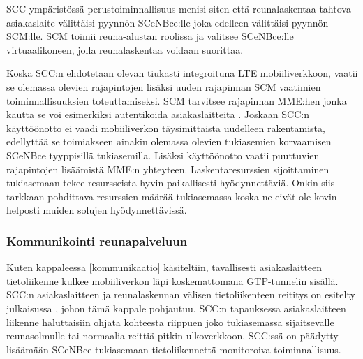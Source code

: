 SCC ympäristössä perustoiminnallisuus menisi siten että reunalaskentaa tahtova asiakaslaite välittäisi pyynnön SCeNBce:lle joka edelleen välittäisi pyynnön SCM:lle.
SCM toimii reuna-alustan roolissa ja valitsee SCeNBce:lle virtuaalikoneen, jolla reunalaskentaa voidaan suorittaa. \cite{dolezal2016performance}


Koska SCC:n ehdotetaan olevan tiukasti integroituna LTE mobiiliverkkoon, vaatii se olemassa olevien rajapintojen lisäksi uuden rajapinnan SCM vaatimien toiminnallisuuksien toteuttamiseksi. SCM tarvitsee rajapinnan MME:hen jonka kautta se voi esimerkiksi autentikoida asiakaslaitteita \cite{lobillo15scc}. 
Joskaan SCC:n käyttöönotto ei vaadi mobiiliverkon täysimittaista uudelleen rakentamista, edellyttää se toimiakseen ainakin olemassa olevien tukiasemien korvaamisen SCeNBce tyyppisillä tukiasemilla. Lisäksi käyttöönotto vaatii puuttuvien rajapintojen lisäämistä MME:n yhteyteen. 
Laskentaresurssien sijoittaminen tukiasemaan tekee resursseista hyvin paikallisesti hyödynnettäviä. Onkin siis tarkkaan pohdittava resurssien määrää tukiasemassa koska ne eivät ole kovin helposti muiden solujen hyödynnettävissä.

 
%

\subsubsection{Kommunikointi reunapalveluun} \label{GTP}
Kuten kappaleessa \ref{kommunikaatio} käsiteltiin, tavallisesti asiakaslaitteen tietoliikenne kulkee mobiiliverkon läpi koskemattomana GTP-tunnelin sisällä. 
SCC:n asiakaslaitteen ja reunalaskennan välisen tietoliikenteen reititys on esitelty julkaisussa \cite{puente15seamless}, johon tämä kappale pohjautuu.
SCC:n tapauksessa asiakaslaitteen liikenne haluttaisiin ohjata kohteesta riippuen joko tukiasemassa sijaitsevalle reunasolmulle tai normaalia reittiä pitkin ulkoverkkoon.
SCC:ssä on päädytty lisäämään SCeNBce tukiasemaan tietoliikennettä monitoroiva toiminnallisuus.

